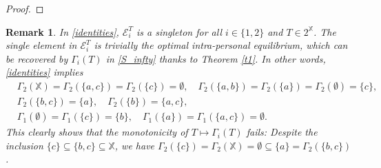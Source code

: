 \documentclass[11pt,reqno]{article}
\numberwithin{equation}{section}
\newtheorem{remark}{Remark}[section]
\newcommand{\cE}{\mathcal{E}}
\newcommand{\X}{\mathbb{X}}
\begin{document}
\begin{proof}
\end{proof}

\begin{remark}
In \eqref{identities}, $\cE_i^T$ is a singleton for all $i\in\{1,2\}$ and $T\in 2^\X$. The single element in $\cE_i^T$ is trivially the optimal intra-personal equilibrium, which can be recovered by $\Gamma_i(T)$ in \eqref{S_infty} thanks to Theorem \ref{t1}. In other words, \eqref{identities} implies
\begin{equation}\label{identities'}
\begin{split}
&\Gamma_2(\X) = \Gamma_2(\{a,c\}) =\Gamma_2(\{c\}) = \emptyset,\quad \Gamma_2(\{a,b\}) = \Gamma_2(\{a\}) =\Gamma_2(\emptyset) = \{c\},\\
& \Gamma_2(\{b,c\})=\{a\},\quad \Gamma_2(\{b\})=\{a,c\},\\
& \Gamma_1(\emptyset)= \Gamma_1(\{c\})=\{b\},\quad \Gamma_1(\{a\}) = \Gamma_1(\{a,c\})=\emptyset.
\end{split}
\end{equation}
This clearly shows that the monotonicity of $T\mapsto \Gamma_i(T)$ %
fails: Despite the inclusion $\{c\}\subseteq\{b,c\}\subseteq \X$, we have $\Gamma_2(\{c\}) =\Gamma_2(\X) = \emptyset\subseteq\{a\}=\Gamma_2(\{b,c\})$.
\end{remark}
\end{document}
